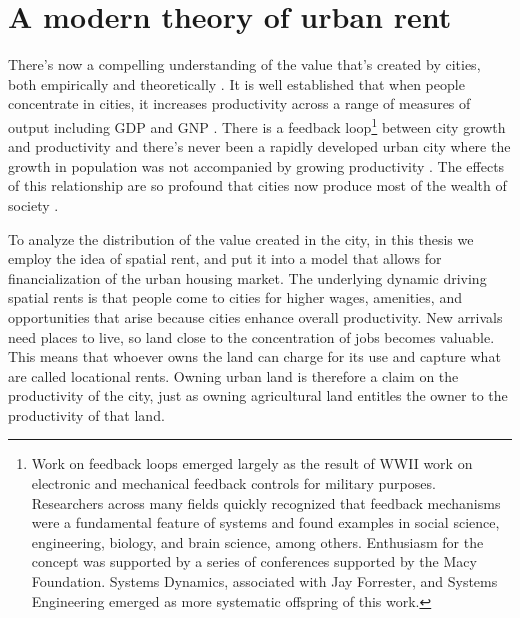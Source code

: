 \section{A modern theory of urban rent}
There's now a compelling understanding of the value that's created by cities, both empirically and theoretically \cite{jacobsEconomyCities1969, spenceUrbanizationGrowth2009, bettencourtIntroductionUrbanScience2021}. 
It is well established that when people concentrate in cities, it increases productivity across a range of measures of output including GDP and GNP \cite{bettencourtIntroductionUrbanScience2021}. There is a feedback loop\footnote{Work on feedback loops emerged largely as the result of WWII work on electronic and mechanical feedback controls for military purposes. Researchers across many fields %
quickly recognized that feedback mechanisms were a fundamental feature of systems and found examples in social science, engineering, biology, and brain science, among others. Enthusiasm for the concept was supported by a series of conferences supported by the Macy Foundation. %
Systems Dynamics, associated with Jay Forrester, and Systems Engineering emerged as more systematic offspring of this work.} %
between city growth and productivity and there's never been a rapidly developed urban city where the growth in population was not accompanied by growing productivity \cite{annezUrbanizationGrowthSetting2009}.  %
The effects of this relationship are so profound that cities now produce most of the wealth of society \cite{bettencourtIntroductionUrbanScience2021}. %


To analyze the distribution of the value created in the city, in this thesis we employ the idea of spatial rent, and put it into a model that allows for financialization of the urban housing market. The underlying dynamic driving spatial rents is that people come to cities for higher wages, amenities, and opportunities that arise because cities enhance overall productivity. New arrivals need places to live, so land close to the concentration of jobs becomes valuable. This means that whoever owns the land can charge for its use and capture what are called \glspl{locational rent}. Owning urban land is therefore a claim on the productivity of the city, just as owning agricultural land entitles the owner to the productivity of that land. %



